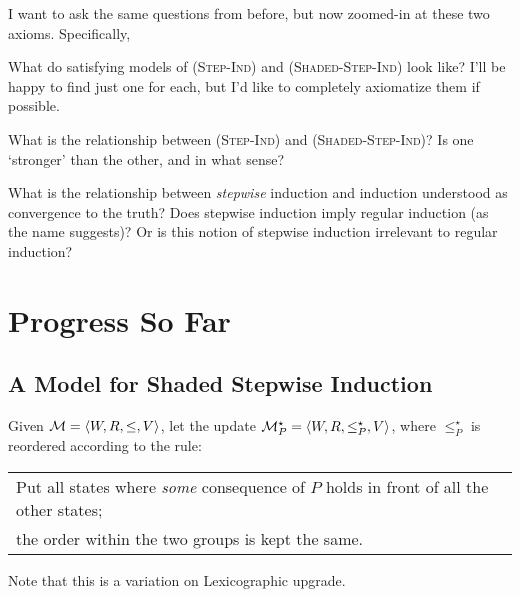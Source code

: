 \documentclass[letterpaper]{article}
\begin{document}
I want to ask the same questions from before, but now zoomed-in at these two axioms.  Specifically,

\begin{question}
    What do satisfying models of \textsc{(Step-Ind)} and \textsc{(Shaded-Step-Ind)} look like?  I'll be happy to find just one for each, but I'd like to completely axiomatize them if possible.
\end{question}

\begin{question}
    What is the relationship between \textsc{(Step-Ind)} and \textsc{(Shaded-Step-Ind)}?  Is one `stronger' than the other, and in what sense?
\end{question}

\begin{question}
    What is the relationship between \emph{stepwise} induction and induction understood as convergence to the truth?  Does stepwise induction imply regular induction (as the name suggests)?  Or is this notion of stepwise induction irrelevant to regular induction?
\end{question}


\section*{Progress So Far}

\subsection*{A Model for Shaded Stepwise Induction}

\begin{definition}
    Given $\mathcal{M} = \langle W, R, \leq, V \rangle$, let the update $\mathcal{M}^\star_P = \langle W, R, \leq^\star_P, V \rangle$, where $\leq^\star_P$ is reordered according to the rule:
    \begin{center}
    \begin{tabular}{l}
        Put all states where \emph{some} consequence of
        $P$ holds in front of all the other states;\\
        the order within the two groups is kept the same.
    \end{tabular}
    \end{center}
    Note that this is a variation on Lexicographic upgrade.

\end{definition}
\end{document}

